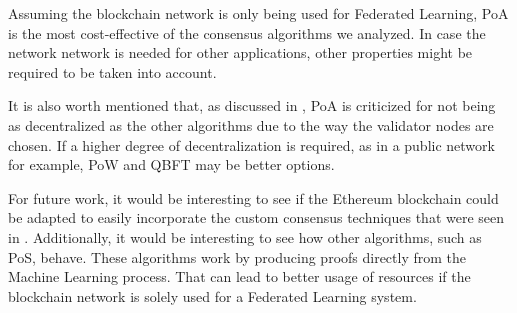 Assuming the blockchain network is only being used for Federated Learning, PoA is the most cost-effective of the consensus algorithms we analyzed. In case the network network is needed for other applications, other properties might be required to be taken into account.

It is also worth mentioned that, as discussed in , PoA is criticized for not being as decentralized as the other algorithms due to the way the validator nodes are chosen. If a higher degree of decentralization is required, as in a public network for example, PoW and QBFT may be better options.

For future work, it would be interesting to see if the Ethereum blockchain could be adapted to easily incorporate the custom consensus techniques that were seen in . Additionally, it would be interesting to see how other algorithms, such as PoS, behave. These algorithms work by producing proofs directly from the Machine Learning process. That can lead to better usage of resources if the blockchain network is solely used for a Federated Learning system.